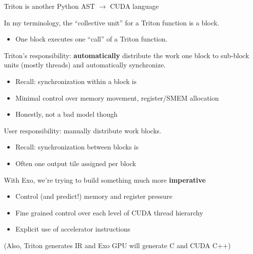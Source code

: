 \begin{minipage}[t]{0.7\textwidth}\fixminipage
Triton is another Python AST $\to$ CUDA language

In my terminology, the ``collective unit'' for a Triton function is a block.
\begin{itemize}
  \item One block executes one ``call'' of a Triton function.
\end{itemize}

Triton's responsibility: \textbf{automatically} distribute the work  one block to sub-block units (mostly threads) and automatically synchronize.
\begin{itemize}
  \item Recall: synchronization within a block is 
  \item Minimal control over memory movement, register/SMEM allocation
  \item Honestly, not a bad model though
\end{itemize}

User responsibility: manually distribute work  blocks.
\begin{itemize}
  \item Recall: synchronization between blocks is 
  \item Often one output tile assigned per block
\end{itemize}

With Exo, we're trying to build something much more \textbf{imperative}
\begin{itemize}
  \item Control (and predict!) memory and register pressure
  \item Fine grained control over each level of CUDA thread hierarchy
  \item Explicit use of accelerator instructions
\end{itemize}
\end{minipage}

\vspace{6mm}
\hfill(Also, Triton generates IR and Exo GPU will generate C and CUDA C++)

\newpage
{}

